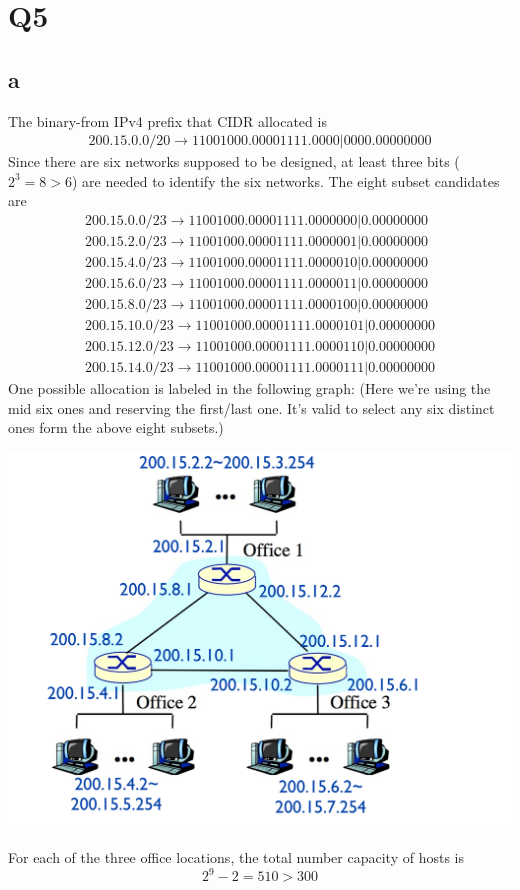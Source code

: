 \documentclass[a4paper, 11pt]{article}
\begin{document}
\section{Q5}
\subsection{a}
The binary-from IPv4 prefix that CIDR allocated is 
\begin{align}
	200.15.0.0/20 \to 11001000.00001111.0000| 0000.00000000
\end{align}
Since there are six networks supposed to be designed, at least three bits ($2^3
= 8 > 6$) are needed to identify the six networks. The eight subset candidates 
are
\begin{align}
200.15.0.0/23 \to 11001000.00001111.0000000|0.00000000 \\
200.15.2.0/23 \to 11001000.00001111.0000001|0.00000000 \\
200.15.4.0/23 \to 11001000.00001111.0000010|0.00000000 \\
200.15.6.0/23 \to 11001000.00001111.0000011|0.00000000 \\ 
200.15.8.0/23 \to 11001000.00001111.0000100|0.00000000 \\
200.15.10.0/23 \to 11001000.00001111.0000101|0.00000000 \\
200.15.12.0/23 \to 11001000.00001111.0000110|0.00000000 \\
200.15.14.0/23 \to 11001000.00001111.0000111|0.00000000
\end{align}
One possible allocation is labeled in the following graph: (Here we're using the
mid six ones and reserving the first/last one. It's valid to select any six distinct
ones form the above eight subsets.)
\begin{center}
	\includegraphics[scale=0.32]{5001.pdf}
\end{center}
For each of the three office locations, the total number capacity of hosts is 
\begin{equation}
	2^9 - 2 = 510 > 300
\end{equation}
\end{document}
